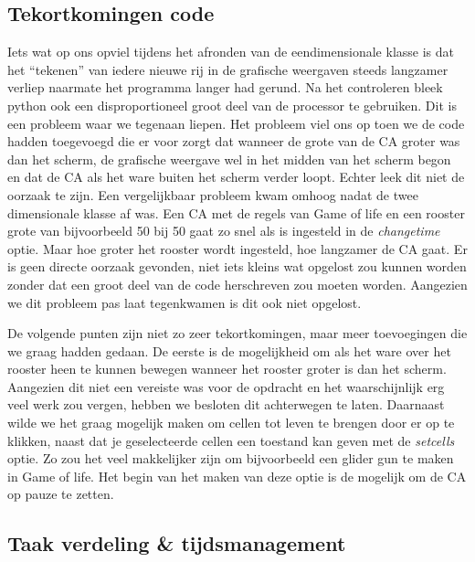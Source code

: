 \documentclass{article}
\begin{document}
\subsection{Tekortkomingen code}
Iets wat op ons opviel tijdens het afronden van de eendimensionale klasse is dat het “tekenen” van iedere nieuwe rij in de grafische weergaven steeds langzamer verliep naarmate het programma langer had gerund. Na het controleren bleek python ook een disproportioneel groot deel van de processor te gebruiken. Dit is een probleem waar we tegenaan liepen. Het probleem viel ons op toen we de code hadden toegevoegd die er voor zorgt dat wanneer de grote van de CA groter was dan het scherm, de grafische weergave wel in het midden van het scherm begon en dat de CA als het ware buiten het scherm verder loopt. Echter leek dit niet de oorzaak te zijn. \newline
Een vergelijkbaar probleem kwam omhoog nadat de twee dimensionale klasse af was. Een CA met de regels van Game of life en een rooster grote van bijvoorbeeld 50 bij 50 gaat zo snel als is ingesteld in de \emph{changetime} optie. Maar hoe groter het rooster wordt ingesteld, hoe langzamer de CA gaat. Er is geen directe oorzaak gevonden, niet iets kleins wat opgelost zou kunnen worden zonder dat een groot deel van de code herschreven zou moeten worden. Aangezien we dit probleem pas laat tegenkwamen is dit ook niet opgelost.

De volgende punten zijn niet zo zeer tekortkomingen, maar meer toevoegingen die we graag hadden gedaan. \newline
De eerste is de mogelijkheid om als het ware over het rooster heen te kunnen bewegen wanneer het rooster groter is dan het scherm. Aangezien dit niet een vereiste was voor de opdracht en het waarschijnlijk erg veel werk zou vergen, hebben we besloten dit achterwegen te laten.\newline
Daarnaast wilde we het graag mogelijk maken om cellen tot leven te brengen door er op te klikken, naast dat je geselecteerde cellen een toestand kan geven met de \emph{setcells} optie. Zo zou het veel makkelijker zijn om bijvoorbeeld een glider gun te maken in Game of life. Het begin van het maken van deze optie is de mogelijk om de CA op pauze te zetten.

\subsection{Taak verdeling \& tijdsmanagement}
\end{document}
